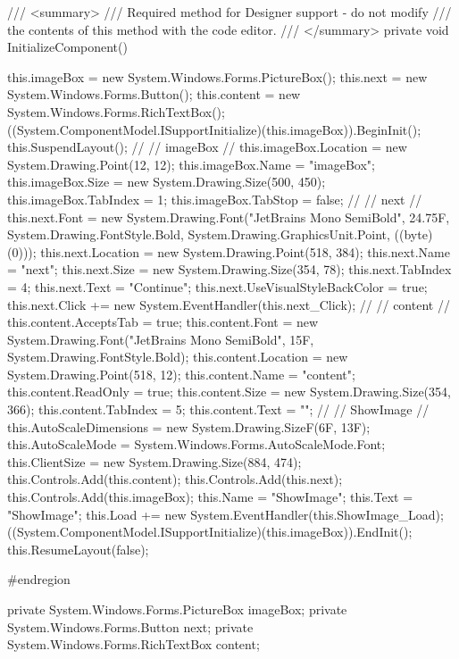 \begin{flushleft}
\begin{cscode}
{    /// <summary>
    /// Required method for Designer support - do not modify
    /// the contents of this method with the code editor.
    /// </summary>
    private void InitializeComponent()
    {
        this.imageBox = new System.Windows.Forms.PictureBox();
        this.next = new System.Windows.Forms.Button();
        this.content = new System.Windows.Forms.RichTextBox();
        ((System.ComponentModel.ISupportInitialize)(this.imageBox)).BeginInit();
        this.SuspendLayout();
        // 
        // imageBox
        // 
        this.imageBox.Location = new System.Drawing.Point(12, 12);
        this.imageBox.Name = "imageBox";
        this.imageBox.Size = new System.Drawing.Size(500, 450);
        this.imageBox.TabIndex = 1;
        this.imageBox.TabStop = false;
        // 
        // next
        // 
        this.next.Font = new System.Drawing.Font("JetBrains Mono SemiBold", 24.75F, System.Drawing.FontStyle.Bold, System.Drawing.GraphicsUnit.Point, ((byte)(0)));
        this.next.Location = new System.Drawing.Point(518, 384);
        this.next.Name = "next";
        this.next.Size = new System.Drawing.Size(354, 78);
        this.next.TabIndex = 4;
        this.next.Text = "Continue";
        this.next.UseVisualStyleBackColor = true;
        this.next.Click += new System.EventHandler(this.next_Click);
        // 
        // content
        // 
        this.content.AcceptsTab = true;
        this.content.Font = new System.Drawing.Font("JetBrains Mono SemiBold", 15F, System.Drawing.FontStyle.Bold);
        this.content.Location = new System.Drawing.Point(518, 12);
        this.content.Name = "content";
        this.content.ReadOnly = true;
        this.content.Size = new System.Drawing.Size(354, 366);
        this.content.TabIndex = 5;
        this.content.Text = "";
        // 
        // ShowImage
        // 
        this.AutoScaleDimensions = new System.Drawing.SizeF(6F, 13F);
        this.AutoScaleMode = System.Windows.Forms.AutoScaleMode.Font;
        this.ClientSize = new System.Drawing.Size(884, 474);
        this.Controls.Add(this.content);
        this.Controls.Add(this.next);
        this.Controls.Add(this.imageBox);
        this.Name = "ShowImage";
        this.Text = "ShowImage";
        this.Load += new System.EventHandler(this.ShowImage_Load);
        ((System.ComponentModel.ISupportInitialize)(this.imageBox)).EndInit();
        this.ResumeLayout(false);

    }

    #endregion

    private System.Windows.Forms.PictureBox imageBox;
    private System.Windows.Forms.Button next;
    private System.Windows.Forms.RichTextBox content;
}
        

\end{cscode}
\end{flushleft}
